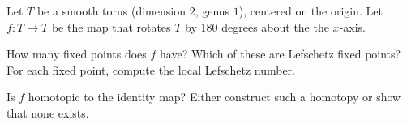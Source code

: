 Let $T$ be a smooth torus (dimension $2$, genus $1$), centered on the
origin. Let $f:T\rightarrow T$ be the map that rotates $T$ by $180$
degrees about the the $x$-axis.
\begin{alist}
\item How many fixed points does $f$ have? Which of these are
Lefschetz fixed points? For each fixed point, compute the local
Lefschetz number.
\item Is $f$ homotopic to the identity map? Either construct such a
homotopy or show that none exists.
\end{alist}
